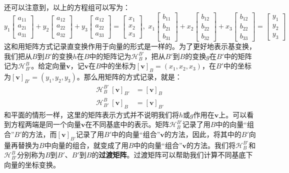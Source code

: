\documentclass[12pt,UTF8,fontset=none]{ctexbook}
\begin{document}
还可以注意到，以上的方程组可以写为：
$$ 
y_1\begin{bmatrix}
    a_{11}\\ a_{21} \\ a_{31}
\end{bmatrix} + y_2 \begin{bmatrix}
    a_{12}\\ a_{22} \\ a_{32}
\end{bmatrix} + y_3 \begin{bmatrix}
    a_{12}\\ a_{22} \\ a_{33} 
\end{bmatrix} = \begin{bmatrix}
    x_1 \\ x_2 \\ x_3 
\end{bmatrix},\,\, x_1\begin{bmatrix}
    b_{11}\\ b_{21} \\ b_{31}
\end{bmatrix} + x_2 \begin{bmatrix}
    b_{12}\\ b_{22} \\ b_{32}
\end{bmatrix} + x_3 \begin{bmatrix}
    b_{12}\\ b_{22} \\ b_{33} 
\end{bmatrix} = \begin{bmatrix}
    y_1 \\ y_2 \\ y_3 
\end{bmatrix}
$$
这和用矩阵方式记录直变换作用于向量的形式是一样的。为了更好地表示基变换，我们把从$B$到$B'$的变换$h$在$B$中的矩阵记为$\mathcal{H}_B^{B'}$，把从$B'$到$B$的变换$g$在$B'$中的矩阵记为$\mathcal{H}_{B'}^B$。给定向量$\mathbf{v}$，记$\mathbf{v}$在$B$中的坐标为$[\mathbf{v}]_B = (x_1,x_2,x_3)$，在$B'$中的坐标为$[\mathbf{v}]_{B'} = (y_1,y_2,y_3)$。那么用矩阵的方式记录，就是：
\begin{align*}
    \mathcal{H}_B^{B'}~[\mathbf{v}]_{B'} &= [\mathbf{v}]_B \\
    \mathcal{H}_{B'}^B~[\mathbf{v}]_{B} &= [\mathbf{v}]_{B'} 
\end{align*}
和平面的情形一样，这里的矩阵表示方式并不说明我们将$h$或$g$作用在$\mathbf{v}$上。可以看到方程两端是同一个向量$\mathbf{v}$在不同基底中的表示。矩阵$\mathcal{H}_B^{B'}$记录了用$B$中的向量“组合”$B'$的方法，而$[\mathbf{v}]_{B'}$记录了用$B'$中的向量“组合”$\mathbf{v}$的方法，因此，将其中的$B'$向量再替换为$B$中向量的组合，就变成了用$B$中的向量“组合”$\mathbf{v}$的方法。我们将$\mathcal{H}_B^{B'}$和$\mathcal{H}_{B'}^B$分别称为$B$到$B'$、$B'$到$B$的\textbf{过渡矩阵}。过渡矩阵可以帮助我们计算不同基底下向量的坐标变换。
\end{document}
